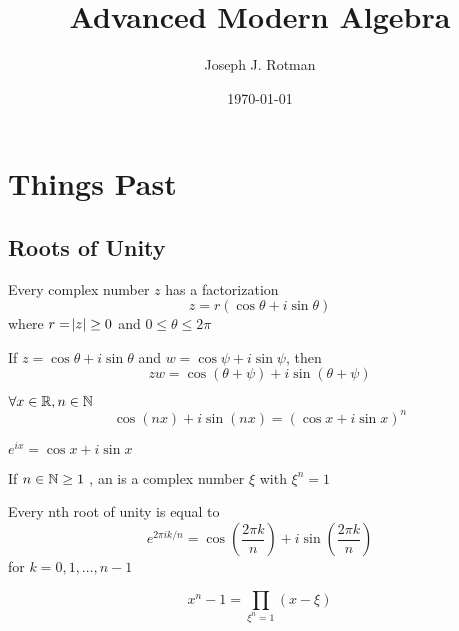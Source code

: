 \documentclass[11pt]{article}
\author{Joseph J. Rotman}
\date{\today}
\title{Advanced Modern Algebra}
\begin{document}
\maketitle
\tableofcontents \clearpage\section{Things Past}
\label{sec:orgb4e3e38}
\subsection{Roots of Unity}
\label{sec:org9dd0169}
\begin{proposition}
Every complex number \(z\) has a factorization
\begin{equation*}
z=r(\cos\theta+i\sin\theta)
\end{equation*}
where \(r=\abs{z}\ge0\) and \(0\le\theta\le 2\pi\)
\end{proposition}

\begin{proposition}
If \(z=\cos\theta+i\sin\theta\) and \(w=\cos\psi+i\sin\psi\), then
\begin{equation*}
zw=\cos(\theta+\psi)+i\sin(\theta+\psi)
\end{equation*}
\end{proposition}

\begin{theorem}[De Moivre]
\(\forall x\in\mathbb{R},n\in\mathbb{N}\)
\begin{equation*}
\cos(nx)+i\sin(nx)=(\cos x+i\sin x)^n
\end{equation*}
\end{theorem}

\begin{theorem}[Euler]
\(e^{ix}=\cos x+i\sin x\)
\end{theorem}

\begin{definition}[]
If \(n\in\mathbb{N}\ge 1\) , an  is a complex number \(\xi\) with
\(\xi^n=1\)
\end{definition}

\begin{corollary}[]
Every nth root of unity is equal to
\begin{equation*}
e^{2\pi ik/n}=\cos(\frac{2\pi k}{n})+i\sin(\frac{2\pi k}{n})
\end{equation*}
for \(k=0,1,\dots,n-1\)
\end{corollary}

\begin{equation*}
x^n-1=\displaystyle\prod_{\xi^n=1}(x-\xi)
\end{equation*}
\end{document}
